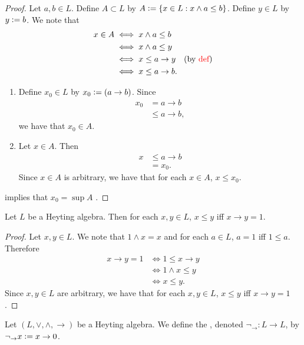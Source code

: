 \documentclass{book}
\begin{document}
	\begin{proof}
		Let $a,b \in L$. Define $A \subset L$ by $A \vcentcolon= \{x \in L: x \wedge a \leq b\}$. Define $y \in L$ by $y \vcentcolon= b$. We note that
		\begin{align*}
			x \in A
			& \iff x \wedge a \leq b \\
			& \iff x \wedge a \leq y \\
			& \iff x \leq a \rightarrow y \quad \text{(by \textcolor{red}{def})} \\
			& \iff x \leq a \rightarrow b.
		\end{align*}
		\begin{enumerate}
			\item Define $x_0 \in L$ by $x_0 \vcentcolon= (a \rightarrow b)$.
			Since 
			\begin{align*}
				x_0 
				& = a \rightarrow b \\
				& \leq a \rightarrow b,
			\end{align*}
			we have that $x_0 \in A$.
			\item Let $x \in A$. Then 
			\begin{align*}
				x 
				& \leq a \rightarrow b \\
				& = x_0.
			\end{align*}
			Since $x \in A$ is arbitrary, we have that for each $x \in A$, $x \leq x_0$.  
		\end{enumerate}
		\rex{}  implies that $x_0 = \sup A$ . 
	\end{proof}
	
	\begin{ex}
		Let $L$ be a Heyting algebra. Then for each $x, y \in L$, $x \leq y$ iff $x \rightarrow y = 1$. 
	\end{ex}
	
	\begin{proof}
		Let $x,y \in L$. We note that $1 \wedge x = x$ and for each $a \in L$, $a = 1$ iff $1 \leq a$. Therefore 
		\begin{align*}
			x \rightarrow y = 1 
			& \iff 1 \leq x \rightarrow y \\
			& \iff 1 \wedge x \leq y \\
			& \iff x \leq y.
		\end{align*}
		Since $x,y \in L$ are arbitrary, we have that for each $x,y \in L$, $x \leq y$ iff $x \rightarrow y = 1$. 
	\end{proof}
	
	\begin{defn}
		Let $(L, \vee, \wedge, \rightarrow)$ be a Heyting algebra. We define the , denoted $\neg_{\rightarrow}: L \rightarrow L$, by $\neg_{\rightarrow} x \vcentcolon= x \rightarrow 0$. 
	\end{defn}
	
\end{document}
